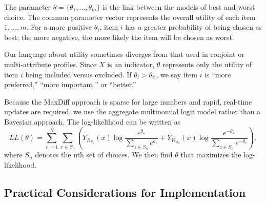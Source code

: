 \documentclass[a4paper,11pt]{article}
\newcommand{\numperset}{L}
\begin{document}
The parameter $\theta=\{\theta_1,\ldots,\theta_m \}$ is the link between the models of best and worst choice. The common parameter vector represents the overall utility of each item $1,\ldots,m$. For a more positive $\theta_i$, item $i$ has a greater probability of being chosen as best; the more negative, the more likely the item will be chosen as worst.

Our language about utility sometimes diverges from that used in conjoint or multi-attribute profiles. Since $X$ is an indicator, $\theta$ represents only the utility of item $i$ being included versus excluded. If $\theta_i > \theta_{i'}$, we say item $i$ is ``more preferred,'' ``more important,'' or ``better.''

Because the MaxDiff approach is sparse for large numbers and rapid, real-time updates are required, we use the aggregate multinomial logit model rather than a Bayesian approach. The log-likelihood can be written as
\[
LL(\theta)=\sum_{n=1}^N \sum_{x \in S_n} (Y_{B_{S_n}}(x)\log{\frac{e^{\theta_x}}{\sum_{z\in S_n} e^{\theta_z}}}+ Y_{W_{S_n}}(x)\log{\frac{e^{-\theta_x}}{\sum_{z\in S_n} e^{-\theta_z}}}),
\]
where $S_n$ denotes the nth set of choices. We then find $\theta$ that maximizes the log-likelihood. 

\subsection*{Practical Considerations for Implementation}


\end{document}
